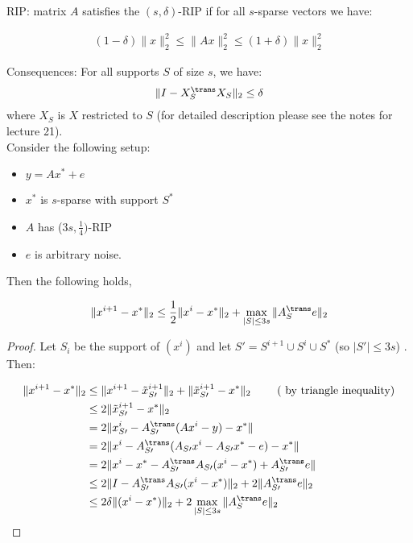 \begin{definition}
RIP: matrix $A$ satisfies the $(s,\delta)$-RIP if for all $s$-sparse vectors we have:

\begin{align*}
(1-\delta) \|x\|_2^2 \leq \|Ax\|_2^2 \leq (1+\delta)\|x\|_2^2
\end{align*}

\end{definition}

Consequences: For all supports $S$ of size $s$, we have:
\begin{align*}
\|I-X_S^{\trans} X_S\|_2 \leq \delta
\end{align*}
where $X_S$ is $X$ restricted to $S$ (for detailed description please see the notes for lecture 21). \\

Consider the following setup: \\
\begin{itemize}
\item $y = Ax^* + e$ \\
\item $x^*$ is $s$-sparse with support $S^*$ \\ 
\item $A$ has ($3s,\frac{1}{4})$-RIP \\
\item $e$ is arbitrary noise.
\end{itemize}
Then the following holds,
\begin{theorem}
$$\|x^{i+1}-x^*\|_2 \leq \frac{1}{2} \|x^{i}-x^*\|_2 + \max_{|S| \leq 3s} \|A_S^{\trans} e\|_2$$
\end{theorem}

\begin{proof}
Let $S_i$ be the support of  $(x^i)$ and let $ S\prime = S^{i+1} \cup S^i \cup S^*$ (so $|S \prime | \leq 3s$) . Then:

\begin{align*}
\|x^{i+1}-x^*\|_2 &\leq \|x^{i+1} - \tilde x_{S\prime }^{i+1}\|_2 + \|\tilde x_{S\prime}^{i+1} -x^*\|_2\  \tag{ by triangle inequality}\\
			 &\leq 2 \|\tilde x_{ S\prime}^{i+1} -x^*\|_2\\ 
			 &= 2 \|x_{ S\prime}^i - A_ { S\prime}^{\trans}(Ax^i -y)-x^*\|\\
			 &= 2 \|x^i - A_ {S\prime}^{\trans}(A_ { S \prime}x^i -A_ { S\prime}x^*-e)-x^*\|\\
			 &= 2 \|x^i - x^*- A_ { S\prime}^{\trans}A_ { S\prime} (x^i-x^*) + A_ {S \prime}^{\trans} e\|\\
			 &\leq 2\| I -  A_ {S \prime}^{\trans} A_ {S \prime} (x^i-x^*)\|_2 +   2\| A_ {S \prime}^{\trans} e\|_2 \\
			 &\leq 2 \delta \| (x^i-x^*)\|_2 +   2 \max_{|S| \leq 3s}\| A_ {S}^{\trans} e\|_2
\end{align*}
\end{proof}

